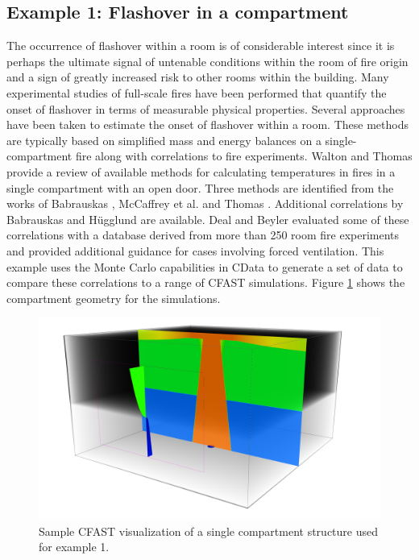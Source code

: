 \documentclass[12pt,twoside]{book}
\begin{document}
\subsection{Example 1: Flashover in a compartment}

The occurrence of flashover within a room is of considerable interest since it is perhaps the ultimate signal of untenable conditions within the room of fire origin and a sign of greatly increased risk to other rooms within the building. Many experimental studies of full-scale fires have been performed that quantify the onset of flashover in terms of measurable physical properties. Several approaches have been taken to estimate the onset of flashover within a room. These methods are typically based on simplified mass and energy balances on a single-compartment fire along with correlations to fire experiments. Walton and Thomas \cite{Walton:2016} provide a review of available methods for calculating temperatures in fires in a single compartment with an open door. Three methods are identified from the works of Babrauskas \cite{Babrauskas:1980}, McCaffrey et al. \cite{McCaffrey:1981uq} and Thomas \cite{Thomas:1981fk}. Additional correlations by Babrauskas \cite{Babrauskas:1980} and H\"ugglund \cite{Hagglund:1980} are available. Deal and Beyler \cite{Valid:DealandBeyler} evaluated some of these correlations with a database derived from more than 250 room fire experiments and provided additional guidance for cases involving forced ventilation. This example uses the Monte Carlo capabilities in CData to generate a set of data to compare these correlations to a range of CFAST simulations. Figure \ref{flashover_geometry} shows the compartment geometry for the simulations.

\begin{figure}[h!]
\centering
\includegraphics[width=4.5in]{FIGURES/Flashover.png}
\caption{Sample CFAST visualization of a single compartment structure used for example 1.}
\label{flashover_geometry}
\end{figure}
\end{document}
